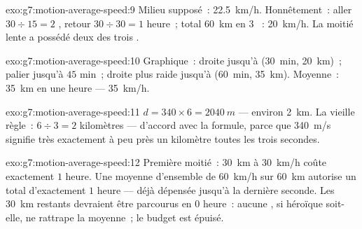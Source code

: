 \begin{solution}{exo:g7:motion-average-speed:9}
Milieu supposé~: \qty{22.5}{km/h}. Honnêtement~: aller
$30 \div 15 = 2$ , retour $30 \div 30 = 1$ heure~; total
\qty{60}{km} en $3$ ~: \qty{20}{km/h}. La moitié lente a
possédé deux des trois .
\end{solution}

\begin{solution}{exo:g7:motion-average-speed:10}
Graphique~: droite jusqu'à (\qty{30}{min}, \qty{20}{km})~; palier
jusqu'à $45$ min~; droite plus raide jusqu'à (\qty{60}{min},
\qty{35}{km}). Moyenne~: \qty{35}{km} en une heure ---
\qty{35}{km/h}.
\end{solution}

\begin{solution}{exo:g7:motion-average-speed:11}
$d = 340 \times 6 = \qty{2040}{m}$ --- environ \qty{2}{km}. La
vieille règle~: $6 \div 3 = 2$ kilomètres --- d'accord avec la
formule, parce que \qty{340}{m/s} signifie très exactement à peu près
un kilomètre toutes les trois secondes.
\end{solution}

\begin{solution}{exo:g7:motion-average-speed:12}
Première moitié~: \qty{30}{km} à \qty{30}{km/h} coûte exactement $1$
heure. Une moyenne d'ensemble de \qty{60}{km/h} sur \qty{60}{km}
autorise un total d'exactement $1$ heure --- déjà dépensée jusqu'à la
dernière seconde. Les \qty{30}{km} restants devraient être parcourus
en $0$ heure~: aucune , si héroïque soit-elle, ne rattrape la
moyenne~; le budget est épuisé.
\end{solution}

